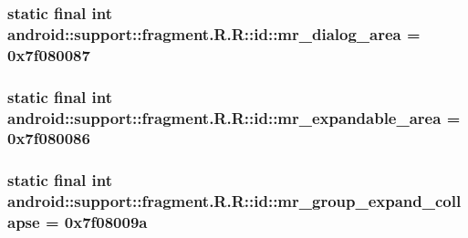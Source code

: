 \hypertarget{classandroid_1_1support_1_1fragment_1_1_r_1_1id_1212c61126df96ebcdf17472117a6d4e}{
\subsubsection[{mr\_\-dialog\_\-area}]{\setlength{\rightskip}{0pt plus 5cm}static final int android::support::fragment.R.R::id::mr\_\-dialog\_\-area = 0x7f080087}}
\label{classandroid_1_1support_1_1fragment_1_1_r_1_1id_1212c61126df96ebcdf17472117a6d4e}


\hypertarget{classandroid_1_1support_1_1fragment_1_1_r_1_1id_0a2f89f0227ebdd0212a8fd2aaa7831f}{
\subsubsection[{mr\_\-expandable\_\-area}]{\setlength{\rightskip}{0pt plus 5cm}static final int android::support::fragment.R.R::id::mr\_\-expandable\_\-area = 0x7f080086}}
\label{classandroid_1_1support_1_1fragment_1_1_r_1_1id_0a2f89f0227ebdd0212a8fd2aaa7831f}


\hypertarget{classandroid_1_1support_1_1fragment_1_1_r_1_1id_af0e711a0b67562245c98dcb528f3e0f}{
\subsubsection[{mr\_\-group\_\-expand\_\-collapse}]{\setlength{\rightskip}{0pt plus 5cm}static final int android::support::fragment.R.R::id::mr\_\-group\_\-expand\_\-collapse = 0x7f08009a}}
\label{classandroid_1_1support_1_1fragment_1_1_r_1_1id_af0e711a0b67562245c98dcb528f3e0f}


